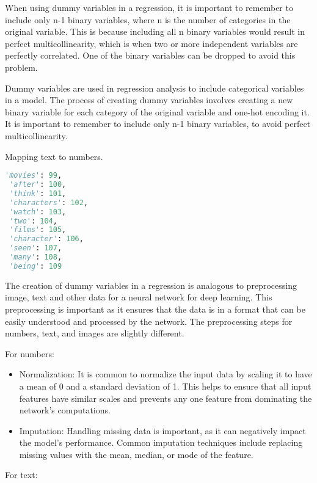 When using dummy variables in a regression, it is important to remember to include only n-1 binary variables, where n is the number of categories in the original variable. This is because including all n binary variables would result in perfect multicollinearity, which is when two or more independent variables are perfectly correlated. One of the binary variables can be dropped to avoid this problem.

Dummy variables are used in regression analysis to include categorical variables in a model. The process of creating dummy variables involves creating a new binary variable for each category of the original variable and one-hot encoding it. It is important to remember to include only n-1 binary variables, to avoid perfect multicollinearity.



\begin{marginlisting}[-0.5cm]
\caption{Mapping text to numbers.}
\vspace{0.2cm}
\begin{lstlisting}[language=Python,style=kaolstplain]
 'movies': 99,
 'after': 100,
 'think': 101,
 'characters': 102,
 'watch': 103,
 'two': 104,
 'films': 105,
 'character': 106,
 'seen': 107,
 'many': 108,
 'being': 109
\end{lstlisting}
\end{marginlisting}


The creation of dummy variables in a regression is analogous to preprocessing image, text and other data for a neural network for deep learning. This preprocessing is important  as it ensures that the data is in a format that can be easily understood and processed by the network. The preprocessing steps for numbers, text, and images are slightly different.

For numbers:
\begin{itemize}
	\item Normalization: It is common to normalize the input data by scaling it to have a mean of 0 and a standard deviation of 1. This helps to ensure that all input features have similar scales and prevents any one feature from dominating the network's computations.
	\item Imputation: Handling missing data is important, as it can negatively impact the model's performance. Common imputation techniques include replacing missing values with the mean, median, or mode of the feature.
\end{itemize}

For text:

